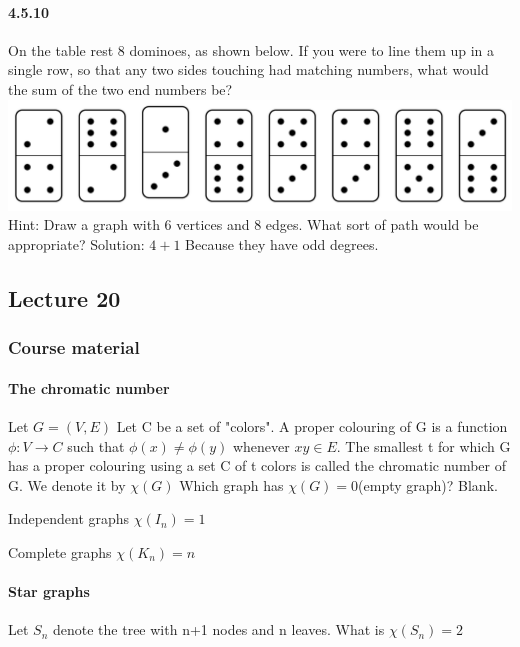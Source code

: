 \documentclass{article}
\begin{document}
\paragraph{4.5.10}
On the table rest 8 dominoes, as shown below. If you were to line
them up in a single row, so that any two sides touching had matching
numbers, what would the sum of the two end numbers be?\newline
\includegraphics{0079}\newline
Hint:\newline
Draw a graph with 6 vertices and 8 edges. What sort of path
would be appropriate?\newline
Solution:\newline
$4+1$ Because they have odd degrees.
\subsection{Lecture 20}
\subsubsection{Course material}
\paragraph{The chromatic number}
Let $G=(V,E)$ Let C be a set of "colors".\newline
A proper colouring of G is a function $\phi : V\to C$ such that $\phi (x) \neq \phi (y)$ whenever $xy\in E$.\newline
The smallest t for which G has a proper colouring using a set C of t colors is called the chromatic number of G.\newline
We denote it by $\chi (G)$\newline
Which graph has $\chi (G)=0$(empty graph)?\newline
Blank.\newline
\par Independent graphs $\chi (I_n)=1$
\par Complete graphs $\chi (K_n)=n$
\paragraph{Star graphs} Let $S_n$ denote the tree with n+1 nodes and n leaves.\newline
What is $\chi (S_n)=2$
\end{document}
